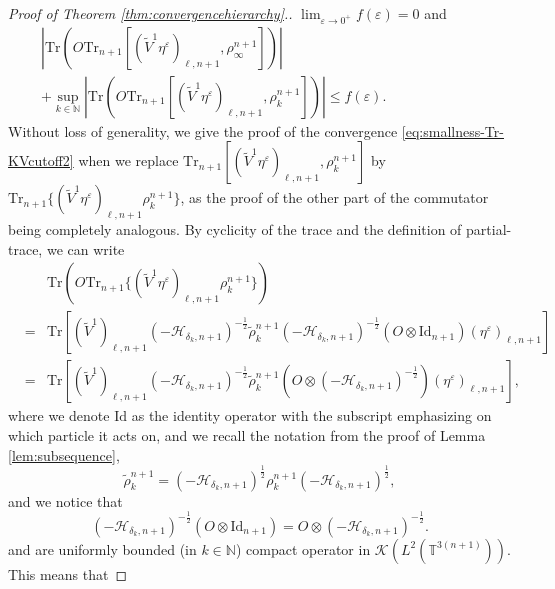 \begin{proof}[Proof of Theorem \ref{thm:convergencehierarchy}.]
  $\lim_{\varepsilon \rightarrow 0^+} f (\varepsilon) = 0$ and
  \begin{align}
   \left| \mathrm{Tr} \left(O \mathrm{Tr}_{n + 1} [(\tilde{V}^1
    \eta^{\varepsilon})_{\ell, n + 1}, \rho^{n + 1}_{\infty}]\right) \right| \qquad\qquad\qquad\qquad\qquad\qquad\qquad\nonumber\\
     + \sup_{k \in
    \mathbb{N}} \left| \mathrm{Tr} \left(O \mathrm{Tr}_{n + 1} [(\tilde{V}^1
    \eta^{\varepsilon})_{\ell, n + 1}, \rho^{n + 1}_k]\right) \right| \leqslant f
    (\varepsilon). \label{eq:smallness-Tr-KVcutoff2}
      \end{align}
  Without loss of generality, we give the
  proof of the convergence \eqref{eq:smallness-Tr-KVcutoff2} when we replace $\mathrm{Tr}_{n
  + 1} [(\tilde{V}^1 \eta^{\varepsilon})_{\ell, n + 1}, \rho^{n + 1}_k]$ by $\mathrm{Tr}_{n
  + 1} \{(\tilde{V}^1 \eta^{\varepsilon})_{\ell, n + 1} \rho^{n + 1}_k\}$, as the proof of the other part of the commutator being completely analogous. By cyclicity of the trace and the definition of partial-trace, we can write
  \begin{eqnarray}
    &  & \mathrm{Tr} \left(O  \mathrm{Tr}_{n
  + 1} \{(\tilde{V}^1 \eta^{\varepsilon})_{\ell, n + 1} \rho^{n + 1}_k\}\right) \nonumber\\
    & = & \mathrm{Tr} \left[(\tilde{V}^1)_{\ell, n + 1} (- \mathcal{H}_{\delta_k,
    n + 1})^{- \frac{1}{2}} \tilde{\rho}^{n + 1}_k (- \mathcal{H}_{\delta_k,
    n + 1})^{- \frac{1}{2}} (O \otimes \mathrm{Id}_{n + 1})
    (\eta^{\varepsilon})_{\ell, n + 1}\right] \nonumber\\
    & = & \mathrm{Tr} \left[(\tilde{V}^1)_{\ell, n + 1} (- \mathcal{H}_{\delta_k,
    n + 1})^{- \frac{1}{2}} \tilde{\rho}^{n + 1}_k \left(O \otimes (-
    \mathcal{H}_{\delta_k, n + 1})^{- \frac{1}{2}}\right) (\eta^{\varepsilon})_{\ell,
    n + 1}\right], \nonumber
  \end{eqnarray}
  where we denote $\mathrm{Id}$ as the identity operator with the subscript emphasizing on which particle it acts on, and we recall the notation from the proof of Lemma \ref{lem:subsequence},
  \[ 
  \tilde{\rho}^{n + 1}_k = (- \mathcal{H}_{\delta_k, n + 1})^{\frac{1}{2}}
     \rho^{n + 1}_k (- \mathcal{H}_{\delta_k, n + 1})^{\frac{1}{2}},
      \]
  and we notice that
  \[ (- \mathcal{H}_{\delta_k, n + 1})^{- \frac{1}{2}} \left(O \otimes
     \mathrm{Id}_{n + 1}\right) = O \otimes (- \mathcal{H}_{\delta_k, n +
     1})^{- \frac{1}{2}} . \]
  and are uniformly bounded (in $k \in \mathbb{N}$) compact operator in
  $\mathcal{K} (L^2 (\mathbb{T}^{3 (n + 1)}))$. This means that

\end{proof}
